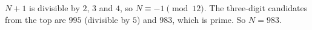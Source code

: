 $N+1$ is divisible by $2$, $3$ and $4$, so $N\equiv-1\pmod{12}$. The three-digit candidates from the top are $995$ (divisible by $5$) and $983$, which is prime. So $N=\boxed{983}$.
